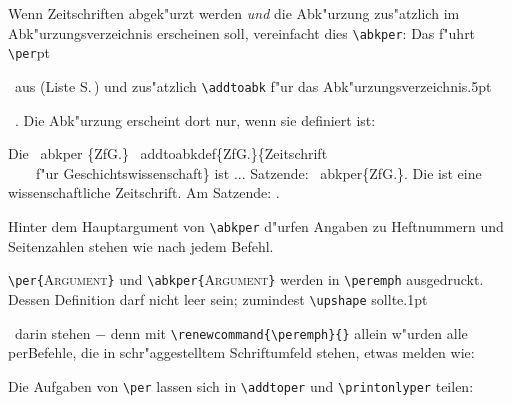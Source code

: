 \documentclass[12pt,a4paper]{article}
\newcommand{\pdfko}[1]{\kern #1pt
                          \strut\ignorespaces}%
\newcommand{\pbs}{\string\ \unskip}
\newcommand{\bs}{\protect\pbs}
\begin{document}
\vspace{1ex}\noindent
Wenn Zeitschriften abgek"urzt werden \textit{und} die Abk"urzung 
zus"atzlich im Abk"urzungsverzeichnis erscheinen soll, vereinfacht
dies \verb|\abkper|: Das f"uhrt \verb|\per|\pdfko{1}\ aus 
(Liste S.\,\pageref{printnumper}) und zus"atzlich
\verb|\addtoabk| f"ur das Abk"urzungsverzeichnis\pdfko{.5}\  
. Die Abk"urzung 
erscheint dort nur, wenn sie definiert ist:

\vspace{-.75ex}
\Doppelbox
{\vspace{.5ex}
 Die \bs abkper \{ZfG.\} \bs addtoabkdef\{ZfG.\}\{Zeitschrift 
 \\ \ \ \ \ f"ur Geschichtswissenschaft\} ist ... Satzende:
 \bs abkper\{ZfG.\}.
 \vspace{.25ex}
}
{\vspace{.75ex}%
 Die   ist eine wissenschaftliche Zeitschrift.
 Am Satzende: \abkper{ZfG.}.
}

\vspace{-.5ex}\noindent
Hinter dem Hauptargument von \verb|\abkper| d"urfen Angaben zu
Heftnummern und Seitenzahlen stehen wie nach jedem \BibArts\hy Befehl.

\vspace{1.25ex}\noindent
\verb|\per{|\textsc{Argument}\verb|}| und \verb|\abkper{|\textsc{Argument}\verb|}| 
werden in \verb|\peremph| ausgedruckt. 
Dessen Definition darf nicht leer sein; zumindest \verb|\upshape| 
sollte\pdfko{.1}\ darin stehen $-$ denn mit \verb|\renewcommand{\peremph}{}| 
allein w"urden alle per\hy Befehle, die in schr"aggestelltem 
Schriftumfeld stehen, etwas melden wie:

\vspace{.5ex}{\scriptsize\begin{verbatim}
   BibArts Warning: Add \upshape to \peremph on input line 1696.
\end{verbatim}}


\noindent
Die Aufgaben von \verb|\per| lassen sich in
\verb|\addtoper| und \verb|\printonlyper| teilen: 
\end{document}
